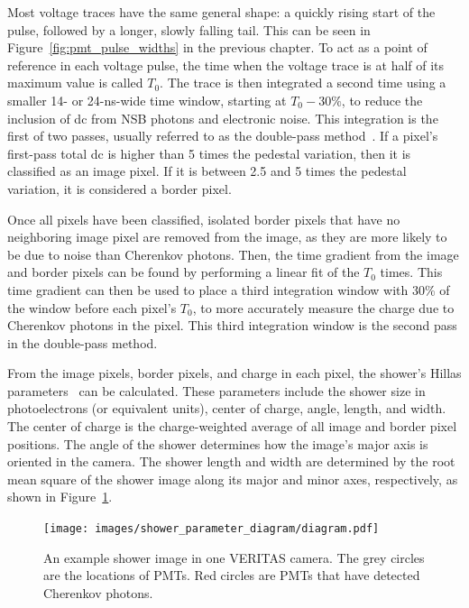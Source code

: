 Most voltage traces have the same general shape: a quickly rising start of the pulse, followed by a longer, slowly falling tail.
This can be seen in Figure~\ref{fig:pmt_pulse_widths} in the previous chapter.
To act as a point of reference in each voltage pulse, the time when the voltage trace is at half of its maximum value is called $T_{0}$.
The trace is then integrated a second time using a smaller 14- or 24-ns-wide time window, starting at $T_0 - 30\%$, to reduce the inclusion of dc from NSB photons and electronic noise.
This integration is the first of two passes, usually referred to as the double-pass method~\cite{doublepass}.
If a pixel's first-pass total dc is higher than 5 times the pedestal variation, then it is classified as an image pixel.
If it is between 2.5 and 5 times the pedestal variation, it is considered a border pixel.

Once all pixels have been classified, isolated border pixels that have no neighboring image pixel are removed from the image, as they are more likely to be due to noise than Cherenkov photons.
Then, the time gradient from the image and border pixels can be found by performing a linear fit of the $T_{0}$ times.
This time gradient can then be used to place a third integration window 
with 30\% of the window before each pixel's $T_{0}$, to more accurately measure the charge due to Cherenkov photons in the pixel.
This third integration window is the second pass in the double-pass method.

From the image pixels, border pixels, and charge in each pixel, the shower's Hillas parameters~\cite{hillas_params} can be calculated.
These parameters include the shower size in photoelectrons (or equivalent units), center of charge, angle, length, and width.
The center of charge is the charge-weighted average of all image and border pixel positions.
The angle of the shower determines how the image's major axis is oriented in the camera.
The shower length and width are determined by the root mean square of the shower image along its major and minor axes, respectively, as shown in Figure~\ref{fig:shower_param}.
  
\begin{figure}[t]
  \centering
  \texttt{[image: images/shower\_parameter\_diagram/diagram.pdf]}
  \caption[Basic Shower Diagram]{
    An example shower image in one VERITAS camera.
    The grey circles are the locations of PMTs.
    Red circles are PMTs that have detected Cherenkov photons.
  }
  \label{fig:shower_param}
\end{figure}
\FloatBarrier

